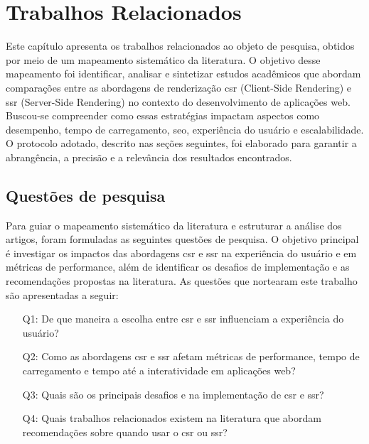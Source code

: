 \chapter{Trabalhos Relacionados}
\label{cap:trabalhos}
Este capítulo apresenta os trabalhos relacionados ao objeto de pesquisa, obtidos por meio de um mapeamento sistemático da literatura. O objetivo desse mapeamento foi identificar, analisar e sintetizar estudos acadêmicos que abordam comparações entre as abordagens de renderização \acrshort{csr} (Client-Side Rendering) e \acrshort{ssr} (Server-Side Rendering) no contexto do desenvolvimento de aplicações web. Buscou-se compreender como essas estratégias impactam aspectos como desempenho, tempo de carregamento, \acrshort{seo}, experiência do usuário e escalabilidade. O protocolo adotado, descrito nas seções seguintes, foi elaborado para garantir a abrangência, a precisão e a relevância dos resultados encontrados.


\section{Questões de pesquisa}
\label{section:questoes_pesquisa}

Para guiar o mapeamento sistemático da literatura e estruturar a análise dos artigos, foram formuladas as seguintes questões de pesquisa. O objetivo principal é investigar os impactos das abordagens \acrshort{csr} e \acrshort{ssr} na experiência do usuário e em métricas de performance, além de identificar os desafios de implementação e as recomendações propostas na literatura. As questões que nortearam este trabalho são apresentadas a seguir:

\begin{enumerate}
    \item[Q1:] De que maneira a escolha entre \acrshort{csr} e \acrshort{ssr} influenciam a experiência do usuário?
    \item[Q2:] Como as abordagens \acrshort{csr} e \acrshort{ssr} afetam métricas de performance, tempo de carregamento e tempo até a interatividade em aplicações web?
    \item[Q3:] Quais são os principais desafios e  na implementação de \acrshort{csr} e \acrshort{ssr}?
    \item[Q4:] Quais trabalhos relacionados existem na literatura que abordam recomendações sobre quando usar o \acrshort{csr} ou \acrshort{ssr}?

\end{enumerate}


